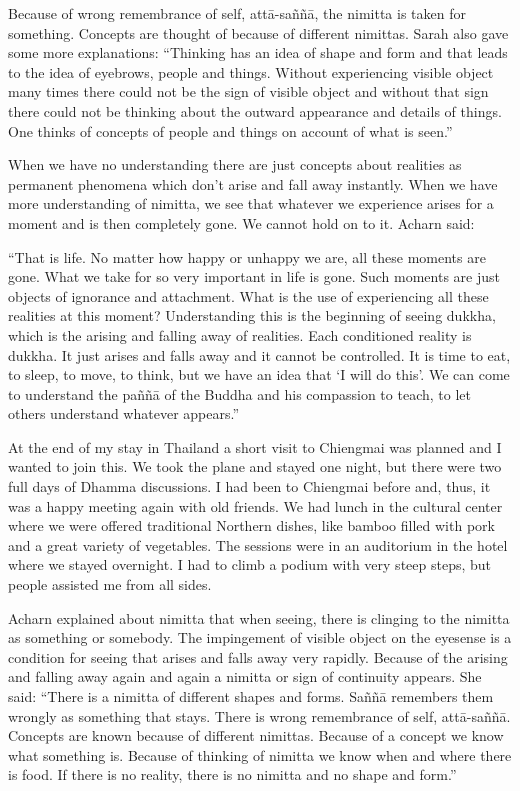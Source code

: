 Because of wrong remembrance of self, attā-saññā, the nimitta is taken
for something. Concepts are thought of because of different nimittas.
Sarah also gave some more explanations: ``Thinking has an idea of shape
and form and that leads to the idea of eyebrows, people and things.
Without experiencing visible object many times there could not be the
sign of visible object and without that sign there could not be thinking
about the outward appearance and details of things. One thinks of
concepts of people and things on account of what is seen.''

When we have no understanding there are just concepts about realities as
permanent phenomena which don't arise and fall away instantly. When we
have more understanding of nimitta, we see that whatever we experience
arises for a moment and is then completely gone. We cannot hold on to
it. Acharn said:

``That is life. No matter how happy or unhappy we are, all these moments
are gone. What we take for so very important in life is gone. Such
moments are just objects of ignorance and attachment. What is the use of
experiencing all these realities at this moment? Understanding this is
the beginning of seeing dukkha, which is the arising and falling away of
realities. Each conditioned reality is dukkha. It just arises and falls
away and it cannot be controlled. It is time to eat, to sleep, to move,
to think, but we have an idea that `I will do this'. We can come to
understand the paññā of the Buddha and his compassion to teach, to let
others understand whatever appears.''

At the end of my stay in Thailand a short visit to Chiengmai was planned
and I wanted to join this. We took the plane and stayed one night, but
there were two full days of Dhamma discussions. I had been to Chiengmai
before and, thus, it was a happy meeting again with old friends. We had
lunch in the cultural center where we were offered traditional Northern
dishes, like bamboo filled with pork and a great variety of vegetables.
The sessions were in an auditorium in the hotel where we stayed
overnight. I had to climb a podium with very steep steps, but people
assisted me from all sides.

Acharn explained about nimitta that when seeing, there is clinging to
the nimitta as something or somebody. The impingement of visible object
on the eyesense is a condition for seeing that arises and falls away
very rapidly. Because of the arising and falling away again and again a
nimitta or sign of continuity appears. She said: ``There is a nimitta of
different shapes and forms. Saññā remembers them wrongly as something
that stays. There is wrong remembrance of self, attā-saññā. Concepts are
known because of different nimittas. Because of a concept we know what
something is. Because of thinking of nimitta we know when and where
there is food. If there is no reality, there is no nimitta and no shape
and form.''

